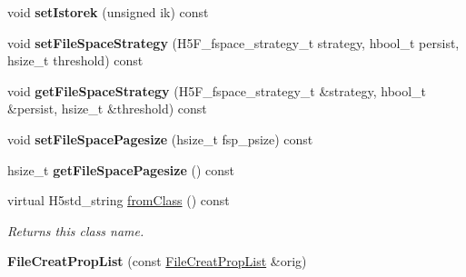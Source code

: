 \begin{DoxyCompactItemize}
\item 
\mbox{\label{class_h5_1_1_file_creat_prop_list_a80007f921e9d8b32848b3a5623d30b8e}} 
void {\bfseries set\+Istorek} (unsigned ik) const
\item 
\mbox{\label{class_h5_1_1_file_creat_prop_list_ad61e21236cf84a827fbb852e747f046e}} 
void {\bfseries set\+File\+Space\+Strategy} (H5\+F\+\_\+fspace\+\_\+strategy\+\_\+t strategy, hbool\+\_\+t persist, hsize\+\_\+t threshold) const
\item 
\mbox{\label{class_h5_1_1_file_creat_prop_list_a1098105f1335c5059ba067193aa5fa2d}} 
void {\bfseries get\+File\+Space\+Strategy} (H5\+F\+\_\+fspace\+\_\+strategy\+\_\+t \&strategy, hbool\+\_\+t \&persist, hsize\+\_\+t \&threshold) const
\item 
\mbox{\label{class_h5_1_1_file_creat_prop_list_a4029784c6a812e170d52d12086dd510a}} 
void {\bfseries set\+File\+Space\+Pagesize} (hsize\+\_\+t fsp\+\_\+psize) const
\item 
\mbox{\label{class_h5_1_1_file_creat_prop_list_aa733fb6b10c11899514cdbb1ac3f825c}} 
hsize\+\_\+t {\bfseries get\+File\+Space\+Pagesize} () const
\item 
\mbox{\label{class_h5_1_1_file_creat_prop_list_a5ae21c5253e8405e8bf0e58ac203b41d}} 
virtual H5std\+\_\+string \hyperlink{class_h5_1_1_file_creat_prop_list_a5ae21c5253e8405e8bf0e58ac203b41d}{from\+Class} () const
\begin{DoxyCompactList}\small\item\em Returns this class name. \end{DoxyCompactList}\item 
\mbox{\label{class_h5_1_1_file_creat_prop_list_a266c0a7238a31abdb2822a24207ffad9}} 
{\bfseries File\+Creat\+Prop\+List} (const \hyperlink{class_h5_1_1_file_creat_prop_list}{File\+Creat\+Prop\+List} \&orig)
\item 
\mbox{\label{class_h5_1_1_file_creat_prop_list_a9bdce8e0eb3f47f633cb96cf81af1f84}} 

\end{DoxyCompactItemize}
